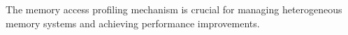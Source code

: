 The memory access profiling mechanism is crucial for managing heterogeneous memory systems and achieving performance improvements. 
